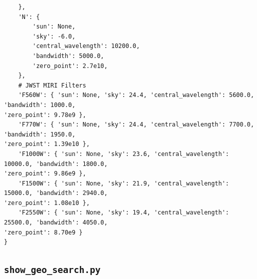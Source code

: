 \documentclass[11pt]{article}
\begin{document}
\begin{Verbatim}
    },
    'N': {
        'sun': None,
        'sky': -6.0,
        'central_wavelength': 10200.0,
        'bandwidth': 5000.0,
        'zero_point': 2.7e10,
    },
    # JWST MIRI Filters
    'F560W': { 'sun': None, 'sky': 24.4, 'central_wavelength': 5600.0, 'bandwidth': 1000.0,
'zero_point': 9.78e9 },
    'F770W': { 'sun': None, 'sky': 24.4, 'central_wavelength': 7700.0, 'bandwidth': 1950.0,
'zero_point': 1.39e10 },
    'F1000W': { 'sun': None, 'sky': 23.6, 'central_wavelength': 10000.0, 'bandwidth': 1800.0,
'zero_point': 9.86e9 },
    'F1500W': { 'sun': None, 'sky': 21.9, 'central_wavelength': 15000.0, 'bandwidth': 2940.0,
'zero_point': 1.08e10 },
    'F2550W': { 'sun': None, 'sky': 19.4, 'central_wavelength': 25500.0, 'bandwidth': 4050.0,
'zero_point': 8.70e9 }
}
\end{Verbatim}
\subsection{\texttt{show\_geo\_search.py}}
\end{document}
